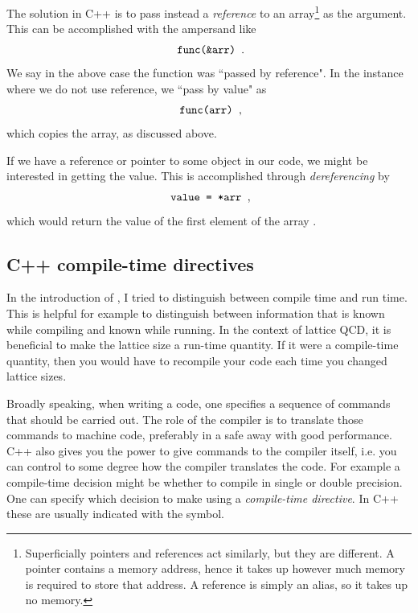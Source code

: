 The solution in C++ is to pass instead a {\it reference} to an 
array\footnote{Superficially pointers and references act similarly, but they are
different. A pointer contains a memory address, hence it takes up however much
memory is required to store that address. A reference is simply an alias, so it
takes up no memory.} as the argument. This can be accomplished with the
ampersand like
\begin{equation*}
\ff{func(\&arr)}.
\end{equation*}
We say in the above case the function was ``passed by reference". In the
instance where we do not use reference, we ``pass by value" as
\begin{equation*}
\ff{func(arr)},
\end{equation*}
which copies the array, as discussed above.

If we have a reference or pointer to some object in our code, we might be interested in
getting the value. This is accomplished through {\it
dereferencing} by
\begin{equation*}
\ff{value = *arr},
\end{equation*}
which would return the value of the first element of the array .

\subsection{C++ compile-time directives}

In the introduction of , I tried to distinguish between compile time
and run time. This is helpful for example to distinguish between information
that is known while compiling and known while running. In the context of lattice
QCD, it is beneficial to make the lattice size a run-time quantity. If it were a
compile-time quantity, then you would have to recompile your code each time you
changed lattice sizes.

Broadly speaking, when writing a code, one specifies a sequence of commands that
should be carried out. The role of the compiler is to translate those commands
to machine code, preferably in a safe away with good performance. C++ also gives
you the power to give commands to the compiler itself, i.e. you can control to
some degree how the compiler translates the code. For example a compile-time
decision might be whether to compile in single or double precision. One can
specify which decision to make using a {\it compile-time
directive}.
In C++ these are usually indicated with the \ff{\#} symbol.

